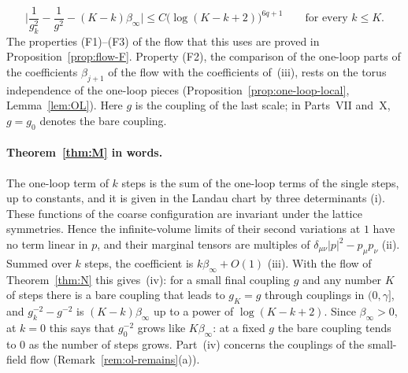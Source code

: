 \begin{maintheorem}
\begin{enumerate}[label=(\roman*)]
\[
\Big|\frac1{g_k^2}-\frac1{g^2}-(K-k)\beta_\infty\Big|\le C\big(\log(K-k+2)\big)^{6q+1}\qquad\text{for every }k\le K.
\]
The properties (F1)--(F3) of the flow that this uses are proved in Proposition~\ref{prop:flow-F}. Property (F2), the comparison of the one-loop parts of the coefficients $\beta_{j+1}$ of the flow with the coefficients of~(iii), rests on the torus independence of the one-loop pieces (Proposition~\ref{prop:one-loop-local}, Lemma~\ref{lem:OL}). Here $g$ is the coupling of the last scale; in Parts~VII and~X, $g=g_0$ denotes the bare coupling.
\end{enumerate}
\end{maintheorem}

\paragraph{Theorem~\ref{thm:M} in words.} The one-loop term of $k$ steps is the sum of the one-loop terms of the single steps, up to constants, and it is given in the Landau chart by three determinants (i). These functions of the coarse configuration are invariant under the lattice symmetries. Hence the infinite-volume limits of their second variations at $1$ have no term linear in $p$, and their marginal tensors are multiples of $\delta_{\mu\nu}|p|^2-p_\mu p_\nu$ (ii). Summed over $k$ steps, the coefficient is $k\beta_\infty+O(1)$ (iii). With the flow of Theorem~\ref{thm:N} this gives~(iv): for a small final coupling $g$ and any number $K$ of steps there is a bare coupling that leads to $g_K=g$ through couplings in $(0,\gamma]$, and $g_k^{-2}-g^{-2}$ is $(K-k)\beta_\infty$ up to a power of $\log(K-k+2)$. Since $\beta_\infty>0$, at $k=0$ this says that $g_0^{-2}$ grows like $K\beta_\infty$: at a fixed $g$ the bare coupling tends to $0$ as the number of steps grows. Part~(iv) concerns the couplings of the small-field flow (Remark~\ref{rem:ol-remains}(a)).

